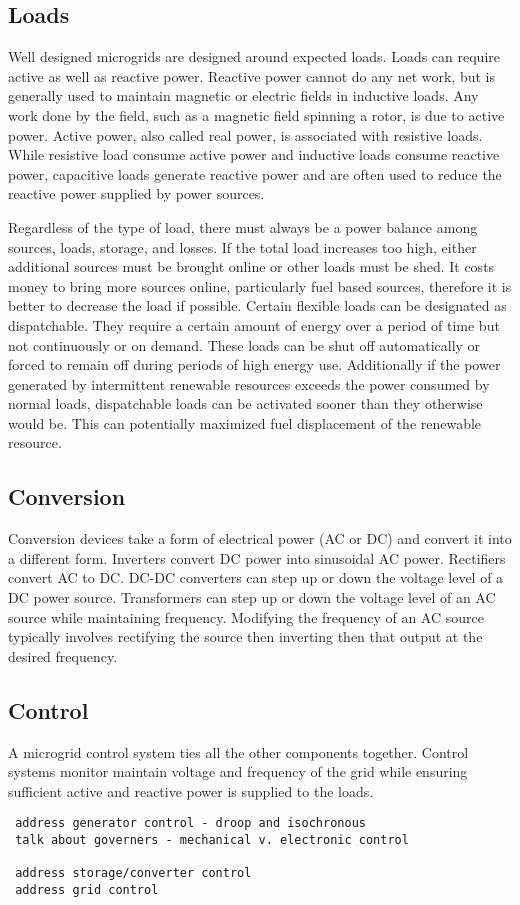 \subsection{Loads}
Well designed microgrids are designed around expected loads. Loads can require active as well as reactive power. Reactive power cannot do any net work, but is generally used to maintain magnetic or electric fields in inductive loads. Any work done by the field, such as a magnetic field spinning a rotor, is due to active power. Active power, also called real power, is associated with resistive loads. While resistive load consume active power and inductive loads consume reactive power, capacitive loads generate reactive power and are often used to reduce the reactive power supplied by power sources. 

Regardless of the type of load, there must always be a power balance among sources, loads, storage, and losses. If the total load increases too high,  either additional sources must be brought online or other loads must be shed. It costs money to bring more sources online, particularly fuel based sources, therefore it is better to decrease the load if possible. Certain flexible loads can be designated as dispatchable. They require a certain amount of energy over a period of time but not continuously or on demand. These loads can be shut off automatically or forced to remain off during periods of high energy use. Additionally if the power generated by intermittent renewable resources exceeds the power consumed by normal loads, dispatchable loads can be activated sooner than they otherwise would be. This can potentially maximized fuel displacement of the renewable resource.  

\subsection{Conversion}
Conversion devices take a form of electrical power (AC or DC) and convert it into a different form. Inverters convert DC power into sinusoidal AC power. Rectifiers convert AC to DC. DC-DC converters can step up or down the voltage level of a DC power source. Transformers can step up or down the voltage level of an AC source while maintaining frequency. Modifying the frequency of an AC source typically involves rectifying the source then inverting then that output at the desired frequency.

\subsection{Control}
A microgrid control system ties all the other components together. Control systems monitor maintain voltage and frequency of the grid while ensuring sufficient active and reactive power is supplied to the loads.
\begin{verbatim} 
 address generator control - droop and isochronous 
 talk about governers - mechanical v. electronic control

 address storage/converter control
 address grid control
\end{verbatim}
